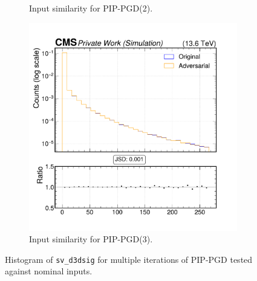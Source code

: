 \begin{figure}[htbp]
\begin{subfigure}[t]{0.32\textwidth}
    \caption*{Input similarity for PIP-PGD(2).}
  \end{subfigure}\hfill
  \begin{subfigure}[t]{0.32\textwidth}
    \includegraphics[width=\linewidth]{media/output/features/compare/combined_it_3/cmp_vtx_arr_sv_d3dsig.pdf}
    \caption*{Input similarity for PIP-PGD(3).}
  \end{subfigure}

  \caption*{Histogram of \texttt{sv\_d3dsig} for multiple iterations of PIP-PGD tested against nominal inputs.}
  \label{fig:combined_input_sv_d3dsig}
\end{figure}

